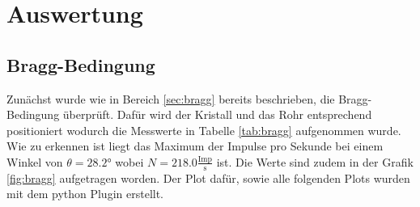 \section{Auswertung}
\label{sec:Auswertung}
\subsection{Bragg-Bedingung}
Zunächst wurde wie in Bereich \ref{sec:bragg} bereits beschrieben, die Bragg-Bedingung überprüft.
Dafür wird der Kristall und das Rohr entsprechend positioniert wodurch die Messwerte in Tabelle \ref{tab:bragg} aufgenommen wurde.
Wie zu erkennen ist liegt das Maximum der Impulse pro Sekunde bei einem Winkel von $\theta = 28.2 \si{\degree} $ wobei $N = 218.0 \frac{\text{Imp}}{\si{\second}}$ ist.
Die Werte sind zudem in der Grafik \ref{fig:bragg} aufgetragen worden.
Der Plot dafür, sowie alle folgenden Plots wurden mit dem python Plugin \cite{matplotlib} erstellt.
